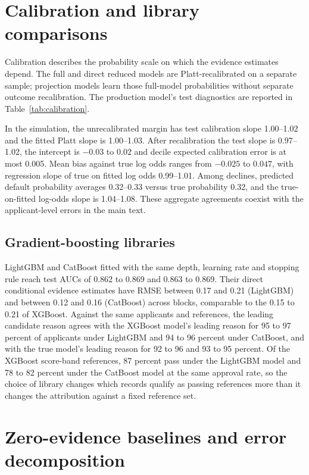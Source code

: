 \section{Calibration and library comparisons}\label{app:calibration}

Calibration describes the probability scale on which the evidence estimates depend. The full and direct reduced models are Platt-recalibrated on a separate sample; projection models learn those full-model probabilities without separate outcome recalibration. The production model's test diagnostics are reported in Table~\ref{tab:calibration}.

In the simulation, the unrecalibrated margin has test calibration slope 1.00--1.02 and the fitted Platt slope is 1.00--1.03. After recalibration the test slope is 0.97--1.02, the intercept is $-0.03$ to $0.02$ and decile expected calibration error is at most 0.005. Mean bias against true log odds ranges from $-0.025$ to $0.047$, with regression slope of true on fitted log odds 0.99--1.01. Among declines, predicted default probability averages 0.32--0.33 versus true probability 0.32, and the true-on-fitted log-odds slope is 1.04--1.08. These aggregate agreements coexist with the applicant-level errors in the main text.



\subsection{Gradient-boosting libraries}

LightGBM and CatBoost fitted with the same depth, learning rate and stopping rule reach test AUCs of 0.862 to 0.869 and 0.863 to 0.869. Their direct conditional evidence estimates have RMSE between 0.17 and 0.21 (LightGBM) and between 0.12 and 0.16 (CatBoost) across blocks, comparable to the 0.15 to 0.21 of XGBoost. Against the same applicants and references, the leading candidate reason agrees with the XGBoost model's leading reason for 95 to 97 percent of applicants under LightGBM and 94 to 96 percent under CatBoost, and with the true model's leading reason for 92 to 96 and 93 to 95 percent. Of the XGBoost score-band references, 87 percent pass under the LightGBM model and 78 to 82 percent under the CatBoost model at the same approval rate, so the choice of library changes which records qualify as passing references more than it changes the attribution against a fixed reference set.


\section{Zero-evidence baselines and error decomposition}\label{app:errors}





